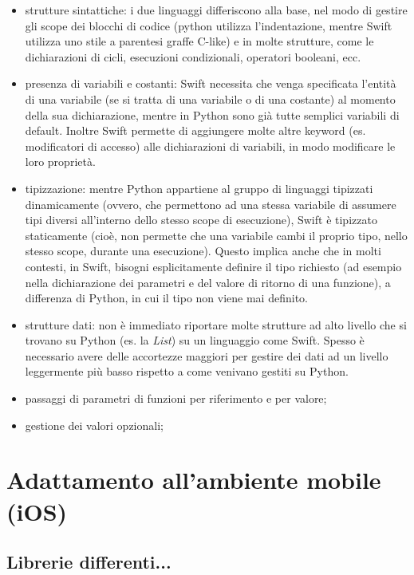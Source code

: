 \begin{itemize}
    \item strutture sintattiche: i due linguaggi differiscono alla base,
    nel modo di gestire gli scope dei blocchi di codice (python utilizza
    l'indentazione, mentre Swift utilizza uno stile a parentesi graffe
    C-like) e in molte strutture, come le dichiarazioni di cicli, 
    esecuzioni condizionali, operatori booleani, ecc.
    \item presenza di variabili e costanti: Swift necessita che venga 
    specificata l'entità di una variabile (se si tratta di una variabile
    o di una costante) al momento della sua dichiarazione, mentre in Python
    sono già tutte semplici variabili di default. Inoltre Swift permette
    di aggiungere molte altre keyword (es. modificatori di accesso) alle
    dichiarazioni di variabili, in modo modificare le loro proprietà.
    \item tipizzazione: mentre Python appartiene al gruppo di linguaggi
    tipizzati dinamicamente (ovvero, che permettono ad una stessa
    variabile di assumere tipi diversi all'interno dello stesso scope
    di esecuzione), Swift è tipizzato staticamente (cioè, non permette
    che una variabile cambi il proprio tipo, nello stesso scope, durante
    una esecuzione). Questo implica anche che in molti contesti, in Swift,
    bisogni esplicitamente definire il tipo richiesto (ad esempio nella
    dichiarazione dei parametri e del valore di ritorno di una funzione),
    a differenza di Python, in cui il tipo non viene mai definito. 
    \item strutture dati: non è immediato riportare molte strutture ad alto 
    livello che si trovano su Python (es. la \emph{List}) su un linguaggio
    come Swift. Spesso è necessario avere delle accortezze maggiori per 
    gestire dei dati ad un livello leggermente più basso rispetto a come 
    venivano gestiti su Python. %
    \item passaggi di parametri di funzioni per riferimento e per valore;
    \item gestione dei valori opzionali;
\end{itemize}


\section{Adattamento all'ambiente mobile (iOS)}





\subsection{Librerie differenti...}










